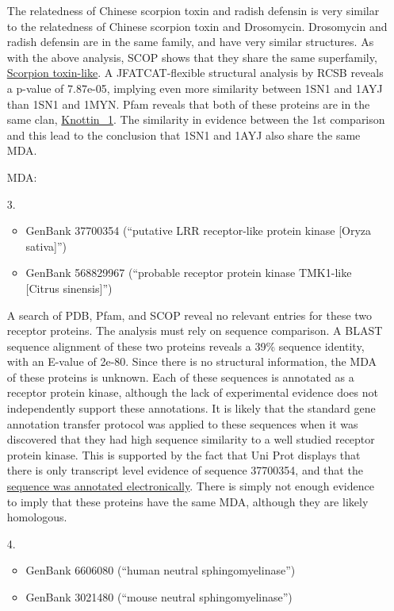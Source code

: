\documentclass[11pt]{article}
\begin{document}
\begin{itemize}
  The relatedness of Chinese scorpion toxin and radish defensin is very similar to 
  the relatedness of Chinese scorpion toxin and Drosomycin. Drosomycin and radish defensin
  are in the same family, and have very similar structures. As with the above analysis,
  SCOP shows that they share the same superfamily, \href{http://scop.mrc-lmb.cam.ac.uk/scop/data/scop.b.h.c.h.html}{Scorpion toxin-like}.
  A JFATCAT-flexible structural analysis by RCSB reveals a p-value of 7.87e-05, implying even more
  similarity between 1SN1 and 1AYJ than 1SN1 and 1MYN. Pfam reveals that both of 
  these proteins are in the same clan, \href{http://pfam.sanger.ac.uk/clan/Knottin_1}{Knottin\_1}.
  The similarity in evidence between the 1st comparison and this lead to the conclusion
  that 1SN1 and 1AYJ also share the same MDA.

  MDA:  

\item[3.]
  \begin{itemize}
  \item GenBank 37700354 (``putative LRR receptor-like protein kinase [Oryza sativa]'')
  \item GenBank 568829967 (``probable receptor protein kinase TMK1-like [Citrus sinensis]'')  
  \end{itemize}

  A search of PDB, Pfam, and SCOP reveal no relevant entries for these two receptor proteins.
  The analysis must rely on sequence comparison. A BLAST sequence alignment 
  of these two proteins reveals a 39\% sequence identity, with an E-value of
  2e-80. Since there is no structural information, the MDA of these proteins is
  unknown. Each of these sequences is annotated as a receptor protein kinase, although 
  the lack of experimental evidence does not independently support these annotations.
  It is likely that the standard gene annotation transfer protocol was applied
  to these sequences when it was discovered that they had high sequence similarity to
  a well studied receptor protein kinase. This is supported by the fact that 
  Uni Prot displays that there is only transcript level evidence of sequence 
  37700354, and that the \href{http://www.uniprot.org/uniprot/Q851L1}{sequence was annotated electronically}. 
  There is simply not enough evidence to 
  imply that these proteins have the same MDA, although they are likely homologous.

\item[4.]
  \begin{itemize}
  \item GenBank 6606080 (``human neutral sphingomyelinase'') 
  \item GenBank 3021480 (``mouse neutral sphingomyelinase'')
  \end{itemize}


\end{itemize}
\end{document}
